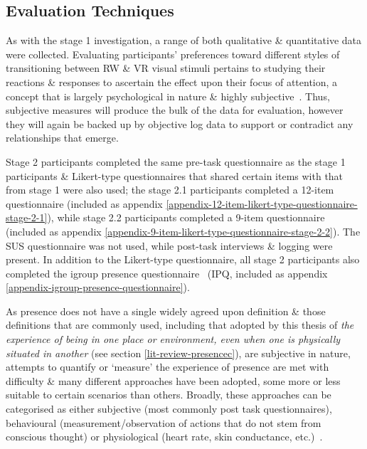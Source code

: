 
\subsection{Evaluation Techniques}

As with the stage 1 investigation, a range of both qualitative \& quantitative data were collected. Evaluating participants' preferences toward different styles of transitioning between RW \& VR visual stimuli pertains to studying their reactions \& responses to ascertain the effect upon their focus of attention, a concept that is largely psychological in nature \& highly subjective~\cite{Ijsselsteijn2001}. Thus, subjective measures will produce the bulk of the data for evaluation, however they will again be backed up by objective log data to support or contradict any relationships that emerge.

Stage 2 participants completed the same pre-task questionnaire as the stage 1 participants \& Likert-type questionnaires that shared certain items with that from stage 1 were also used; the stage 2.1 participants completed a 12-item questionnaire (included as appendix \ref{appendix-12-item-likert-type-questionnaire-stage-2-1}), while stage 2.2 participants completed a 9-item questionnaire (included as appendix \ref{appendix-9-item-likert-type-questionnaire-stage-2-2}). The SUS questionnaire was not used, while post-task interviews \& logging were present. In addition to the Likert-type questionnaire, all stage 2 participants also completed the igroup presence questionnaire~\cite{Schubert2001} (IPQ, included as appendix \ref{appendix-igroup-presence-questionnaire}).

As presence does not have a single widely agreed upon definition \& those definitions that are commonly used, including that adopted by this thesis of \textit{the experience of being in one place or environment, even when one is physically situated in another} (see section \ref{lit-review-presencec}), are subjective in nature, attempts to quantify or `measure' the experience of presence are met with difficulty \& many different approaches have been adopted, some more or less suitable to certain scenarios than others. Broadly, these approaches can be categorised as either subjective (most commonly post task questionnaires), behavioural (measurement/observation of actions that do not stem from conscious thought) or physiological (heart rate, skin conductance, etc.)~\cite{Insko2003}.


